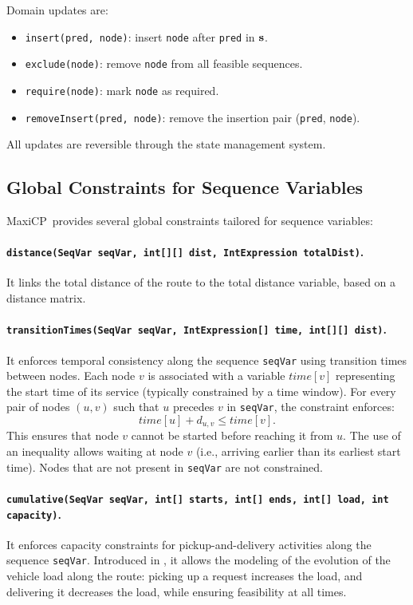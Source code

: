 \documentclass[11pt, a4paper]{scrartcl}
\newcommand{\maxicp}{\textsf{MaxiCP}}
\begin{document}
Domain updates are:
\begin{itemize}
    \item \texttt{insert(pred, node)}: insert \texttt{node} after \texttt{pred} in $\mathbf{s}$.
    \item \texttt{exclude(node)}: remove \texttt{node} from all feasible sequences.
    \item \texttt{require(node)}: mark \texttt{node} as required.
    \item \texttt{removeInsert(pred, node)}: remove the insertion pair (\texttt{pred}, \texttt{node}).
\end{itemize}

All updates are reversible through the state management system.

\subsection{Global Constraints for Sequence Variables}

\maxicp\ provides several global constraints tailored for sequence variables:

\paragraph{\texttt{distance(SeqVar seqVar, int[][] dist, IntExpression totalDist)}.}
It links the total distance of the route to the total distance variable,
based on a distance matrix.

\paragraph{\texttt{transitionTimes(SeqVar seqVar, IntExpression[] time, int[][] dist)}.}
It enforces temporal consistency along the sequence \texttt{seqVar} using transition times between nodes.
Each node $v$ is associated with a variable $\textit{time}[v]$ representing the start time of its service (typically constrained by a time window).
For every pair of nodes $(u, v)$ such that $u$ precedes $v$ in \texttt{seqVar}, the constraint enforces:
$$
\textit{time}[u] + d_{u,v} \leq \textit{time}[v].
$$
This ensures that node $v$ cannot be started before reaching it from $u$.
The use of an inequality allows waiting at node $v$ (i.e., arriving earlier than its earliest start time).
Nodes that are not present in \texttt{seqVar} are not constrained.

\paragraph{\texttt{cumulative(SeqVar seqVar, int[] starts, int[] ends, int[] load, int capacity)}.}
It enforces capacity constraints for pickup-and-delivery activities along the sequence \texttt{seqVar}.
Introduced in \cite{thomas2020insertion}, it allows the modeling of the evolution of the vehicle load along the route:
picking up a request increases the load,
and delivering it decreases the load,
while ensuring feasibility at all times.
\end{document}
